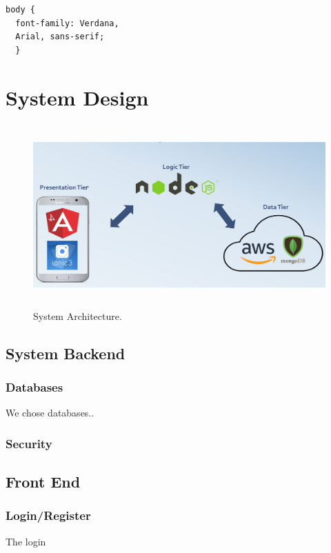 \begin{verbatim}
body {
  font-family: Verdana, 
  Arial, sans-serif;
  }
\end{verbatim}

\chapter{System Design}

\begin{figure}[h]
\centering
\includegraphics[width=14cm, height=7cm]{img/Architecture}
\caption{System Architecture.}
\end{figure}

\section{System Backend}

\subsection{Databases}
We chose databases..


\subsection{Security}

\section{Front End }

\subsection{Login/Register}
\par The login 

